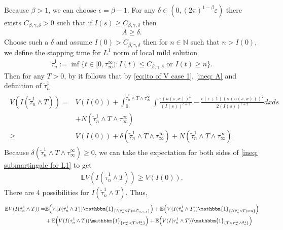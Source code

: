 \documentclass[12pt]{article}
\numberwithin{equation}{section}
\begin{document}
Because $\beta>1$, we can choose $\epsilon=\beta-1$. For any $\delta \in (0, (2\pi)^{1-\beta}\varepsilon)$ there exists $C_{\beta,\gamma,\delta}>0$ such that if $I(s)\geq C_{\beta,\gamma,\delta}$ then
\begin{align}
    A\geq \delta.\label{ineq: A}
\end{align}
Choose such a $\delta$ and assume $I(0)>C_{\beta,\gamma,\delta}$ then for $n\in\mathbb{N}$ such that $n>I(0)$, we define the stopping time for $L^1$ norm of local mild solution 
\begin{align}
    \tilde{\tau}_n^1:=\inf\{t\in [0,\tau_\infty^\infty):I(t)\leq C_{\beta,\gamma,\delta} \text{ or }I(t)\geq n\}.\label{def:tilde_tau_n}
\end{align}
Then for any $T>0$, by it follows that by \eqref{eq:ito of V case 1}, \eqref{ineq: A} and definition of $\tilde{\tau}_n^1$
\begin{align}
   \begin{split}
        V(I(\tilde{\tau}_n^1\land T))=& V(I(0))+\int_0^{\tilde{\tau}_n^1\land T\land\tau_\infty^\infty}\int \frac{\epsilon (u(s,x))^{\beta}}{(I(s))^{\epsilon+1}}-\frac{\epsilon(\epsilon+1)(\sigma(u(s,x)))^2}{2(I(s))^{\epsilon+2}}dxds\\
    &+N(\tilde{\tau}_n^1\land T\land \tau_\infty^\infty)\\
    \geq & V(I(0))+ \delta(\tilde{\tau}_n^1\land T\land\tau_\infty^\infty)+N(\tilde{\tau}_n^1\land T\land \tau_\infty^\infty).
   \end{split}\label{ineq: submartingale for L1}
\end{align}
Because $\delta(\tilde{\tau}_n^1\land T\land\tau_\infty^\infty)\geq 0$, we can take the expectation for both sides of \eqref{ineq: submartingale for L1} to get
\begin{align}
  \mathbb{E}V(I(\tilde{\tau}_n^1\land T))\geq V(I(0)).\label{ineq:supermart property}  
\end{align}
There are 4 possibilities for $I(\tilde{\tau}_n^1\land T)$. Thus,
\begin{align}
    \mathbb{E}V(I(\tilde{\tau}_n^1\land T))=& \mathbb{E}\Big( V(I(\tilde{\tau}_n^1\land T))\mathbbm{1}_{\{I(\tilde{\tau}_n^1\land T)=C_{\beta,\gamma,\delta}\}}\Big)+\mathbb{E}\Big( V(I(\tilde{\tau}_n^1\land T))\mathbbm{1}_{\{I(\tilde{\tau}_n^1\land T)=n\}}\Big)\nonumber\\
    &+ \mathbb{E}\Big( V(I(\tilde{\tau}_n^1\land T))\mathbbm{1}_{\{\tau_\infty^\infty<T\land\tilde{\tau}_n^1\}}\Big)+\mathbb{E}\Big( V(I(\tilde{\tau}_n^1\land T))\mathbbm{1}_{\{T<\tau_\infty^\infty\land\tilde{\tau}_n^1\}}\Big)
\end{align}
\end{document}
